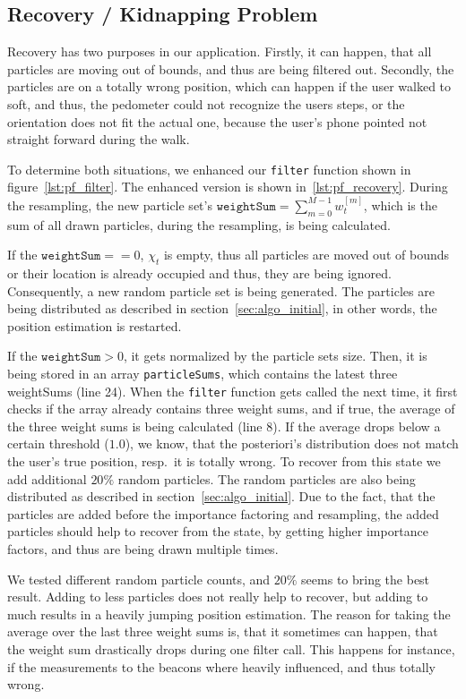 \subsection{Recovery / Kidnapping Problem}
Recovery has two purposes in our application. Firstly, it can happen, that all particles are moving out of bounds, and thus are being filtered out. Secondly, the particles are on a totally wrong position, which can happen if the user walked to soft, and thus, the pedometer could not recognize the users steps, or the orientation does not fit the actual one, because the user's phone pointed not straight forward during the walk.

To determine both situations, we enhanced our \texttt{filter} function shown in figure~\ref{lst:pf_filter}. The enhanced version is shown in~\ref{lst:pf_recovery}. During the resampling, the new particle set's $\texttt{weightSum} = \sum_{m = 0}^{M-1} w^{[m]}_t$, which is the sum of all drawn particles, during the resampling, is being calculated.

If the $\texttt{weightSum} == 0$, $\chi_t$ is empty, thus all particles are moved out of bounds or their location is already occupied and thus, they are being ignored. Consequently, a new random particle set is being generated. The particles are being distributed as described in section~\ref{sec:algo_initial}, in other words, the position estimation is restarted.

If the $\texttt{weightSum} > 0$, it gets normalized by the particle sets size. Then, it is being stored in an array \texttt{particleSums}, which contains the latest three weightSums (line 24). When the \texttt{filter} function gets called the next time, it first checks if the array already contains three weight sums, and if true, the average of the three weight sums is being calculated (line 8). If the average drops below a certain threshold ($1.0$), we know, that the posteriori's distribution does not match the user's true position, resp.\ it is totally wrong. To recover from this state we add additional $20\%$ random particles. The random particles are also being distributed as described in section~\ref{sec:algo_initial}. Due to the fact, that the particles are added before the importance factoring and resampling, the added particles should help to recover from the state, by getting higher importance factors, and thus are being drawn multiple times.

We tested different random particle counts, and $20\%$ seems to bring the best result. Adding to less particles does not really help to recover, but adding to much results in a heavily jumping position estimation. The reason for taking the average over the last three weight sums is, that it sometimes can happen, that the weight sum drastically drops during one filter call. This happens for instance, if the measurements to the beacons where heavily influenced, and thus totally wrong.

